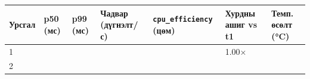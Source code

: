 \begingroup\scriptsize\begin{longtable}[]{@{}lllllll@{}}
\toprule
\begin{minipage}[b]{0.12\columnwidth}\raggedright
Урсгал\strut
\end{minipage} & \begin{minipage}[b]{0.12\columnwidth}\raggedright
p50 (мс)\strut
\end{minipage} & \begin{minipage}[b]{0.12\columnwidth}\raggedright
p99 (мс)\strut
\end{minipage} & \begin{minipage}[b]{0.12\columnwidth}\raggedright
Чадвар (дүгнэлт/с)\strut
\end{minipage} & \begin{minipage}[b]{0.12\columnwidth}\raggedright
\texttt{cpu\_efficiency} (цөм)\strut
\end{minipage} & \begin{minipage}[b]{0.12\columnwidth}\raggedright
Хурдны ашиг vs t1\strut
\end{minipage} & \begin{minipage}[b]{0.12\columnwidth}\raggedright
Темп. өсөлт (°C)\strut
\end{minipage}\tabularnewline
\midrule
\endhead
\begin{minipage}[t]{0.12\columnwidth}\raggedright
1\strut
\end{minipage} & \begin{minipage}[t]{0.12\columnwidth}\raggedright
\strut
\end{minipage} & \begin{minipage}[t]{0.12\columnwidth}\raggedright
\strut
\end{minipage} & \begin{minipage}[t]{0.12\columnwidth}\raggedright
\strut
\end{minipage} & \begin{minipage}[t]{0.12\columnwidth}\raggedright
\strut
\end{minipage} & \begin{minipage}[t]{0.12\columnwidth}\raggedright
1.00×\strut
\end{minipage} & \begin{minipage}[t]{0.12\columnwidth}\raggedright
\strut
\end{minipage}\tabularnewline
\begin{minipage}[t]{0.12\columnwidth}\raggedright
2\strut
\end{minipage} & \begin{minipage}[t]{0.12\columnwidth}\raggedright

\end{minipage}
\end{longtable}
